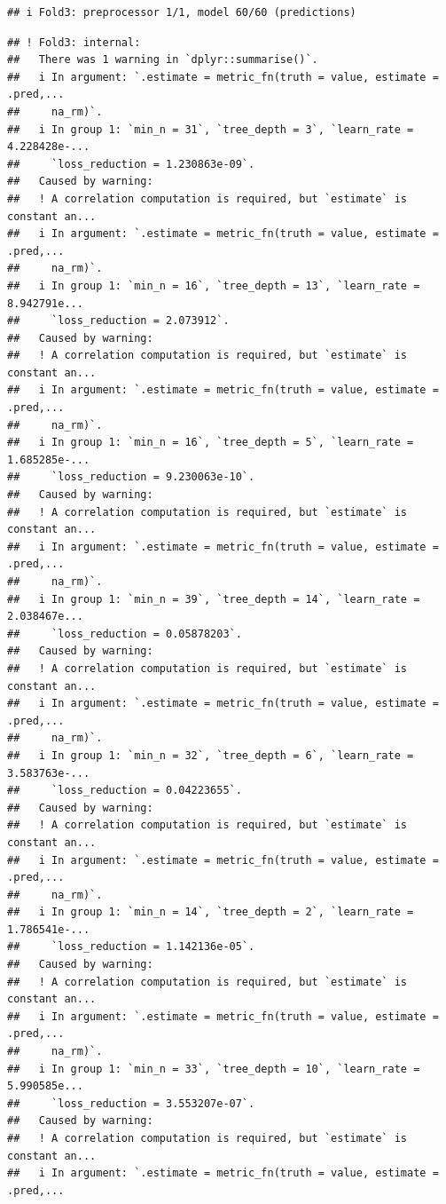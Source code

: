 \documentclass[
]{article}
\begin{document}
\begin{verbatim}
## i Fold3: preprocessor 1/1, model 60/60 (predictions)
\end{verbatim}

\begin{verbatim}
## ! Fold3: internal:
##   There was 1 warning in `dplyr::summarise()`.
##   i In argument: `.estimate = metric_fn(truth = value, estimate = .pred,...
##     na_rm)`.
##   i In group 1: `min_n = 31`, `tree_depth = 3`, `learn_rate = 4.228428e-...
##     `loss_reduction = 1.230863e-09`.
##   Caused by warning:
##   ! A correlation computation is required, but `estimate` is constant an...
##   i In argument: `.estimate = metric_fn(truth = value, estimate = .pred,...
##     na_rm)`.
##   i In group 1: `min_n = 16`, `tree_depth = 13`, `learn_rate = 8.942791e...
##     `loss_reduction = 2.073912`.
##   Caused by warning:
##   ! A correlation computation is required, but `estimate` is constant an...
##   i In argument: `.estimate = metric_fn(truth = value, estimate = .pred,...
##     na_rm)`.
##   i In group 1: `min_n = 16`, `tree_depth = 5`, `learn_rate = 1.685285e-...
##     `loss_reduction = 9.230063e-10`.
##   Caused by warning:
##   ! A correlation computation is required, but `estimate` is constant an...
##   i In argument: `.estimate = metric_fn(truth = value, estimate = .pred,...
##     na_rm)`.
##   i In group 1: `min_n = 39`, `tree_depth = 14`, `learn_rate = 2.038467e...
##     `loss_reduction = 0.05878203`.
##   Caused by warning:
##   ! A correlation computation is required, but `estimate` is constant an...
##   i In argument: `.estimate = metric_fn(truth = value, estimate = .pred,...
##     na_rm)`.
##   i In group 1: `min_n = 32`, `tree_depth = 6`, `learn_rate = 3.583763e-...
##     `loss_reduction = 0.04223655`.
##   Caused by warning:
##   ! A correlation computation is required, but `estimate` is constant an...
##   i In argument: `.estimate = metric_fn(truth = value, estimate = .pred,...
##     na_rm)`.
##   i In group 1: `min_n = 14`, `tree_depth = 2`, `learn_rate = 1.786541e-...
##     `loss_reduction = 1.142136e-05`.
##   Caused by warning:
##   ! A correlation computation is required, but `estimate` is constant an...
##   i In argument: `.estimate = metric_fn(truth = value, estimate = .pred,...
##     na_rm)`.
##   i In group 1: `min_n = 33`, `tree_depth = 10`, `learn_rate = 5.990585e...
##     `loss_reduction = 3.553207e-07`.
##   Caused by warning:
##   ! A correlation computation is required, but `estimate` is constant an...
##   i In argument: `.estimate = metric_fn(truth = value, estimate = .pred,...

\end{verbatim}
\end{document}
